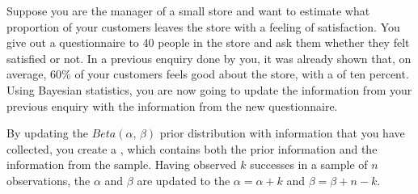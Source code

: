 \setcounter{chapter}{8}
\setcounter{section}{2}
\setcounter{question}{0}



Suppose you are the manager of a small store and want to estimate what proportion of your customers leaves the store with a feeling of satisfaction. You give out a questionnaire to 40 people in the store and ask them whether they felt satisfied or not. In a previous enquiry done by you, it was already shown that, on average, 60\% of your customers feels good about the store, with a  of ten percent. Using Bayesian statistics, you are now going to update the information from your previous enquiry with the information from the new questionnaire. \\



\onelineanswerbox


\emptyanswerbox{
    $\alpha$: \shortanswerline \hspace*{3cm} $\beta$: \shortanswerline
}


By updating the $Beta(\alpha,\, \beta)$ prior distribution with information that you have collected, you create a , which contains both the prior information and the information from the sample. Having observed $k$ successes in a sample of $n$ observations, the  $\alpha$ and $\beta$ are updated to the  $\alpha = \alpha + k$ and $\beta = \beta + n - k$. \\

